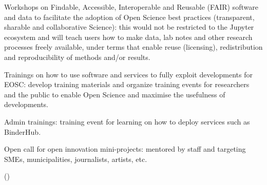 \begin{task}[
  title=Training Workshops and community building,
  id=workshops,
  lead=UIO,
  PM=36,
  wphases={0-48},
  partners={UIO,SRL,XFEL,QS,CDS,WTT,SIL,UPSUD,INSERM}
]
\begin{compactitem}
   \item Workshops on Findable, Accessible, Interoperable and Reusable (FAIR) software and data to facilitate the adoption of Open Science best practices (transparent, sharable and collaborative Science): this would not be restricted to the Jupyter ecosystem and will teach users how to make data, lab notes and other research processes freely available, under terms that enable reuse (licensing), redistribution and reproducibility of methods and/or results.

   \item Trainings on how to use \TheProject software and services to fully exploit \TheProject developments for EOSC: develop training materials and organize training events for researchers and the public to enable Open Science and maximise the usefulness of \TheProject developments.

   \item \TheProject Admin trainings: training event for learning on how to deploy \TheProject services such as BinderHub.


   \item Open call for open innovation mini-projects: mentored by \TheProject staff and targeting SMEs, municipalities, journalists, artists, etc.

  \end{compactitem}
 
    ()
\end{task}
